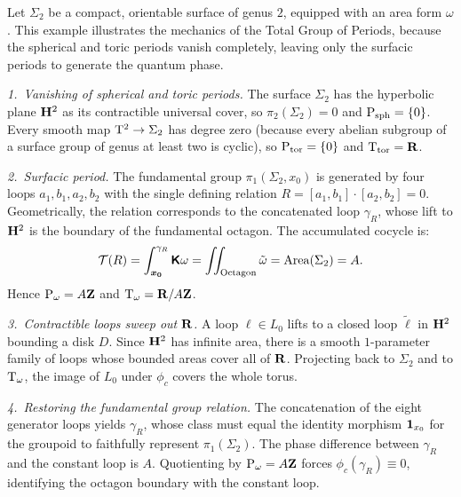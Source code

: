 \documentclass[11pt,reqno,letterpaper,twoside]{amsart}
\begin{document}
  \begin{article}
    \label{art:Explicit Construction: The Surface of Genus 2}
    
    Let $\Sigma_2$ be a compact,
    orientable surface of genus $2$,
    equipped with an area form $\omega$.
    This example illustrates the mechanics of the Total Group of Periods,
    because the spherical and toric periods vanish completely,
    leaving only the surfacic periods to generate the quantum phase.
    
    \textit{1.~Vanishing of spherical and toric periods.}
    The surface $\Sigma_2$ has the hyperbolic plane ${\mathbf H}^2$ as its contractible universal cover,
    so $\pi_2(\Sigma_2) = 0$ and $\operatorname{P}_{\mathrm{sph}} = \{0\}$.
    Every smooth map $\mathrm{T}^2 \to \Sigma_2$ has degree zero
    (because every abelian subgroup of a surface group of genus at least two is cyclic),
    so $\operatorname{P}_{\mathrm{tor}} = \{0\}$ and $\mathrm{T}_{\mathrm{tor}} = {\mathbf{R}}$.
    
    \textit{2.~Surfacic period.}
    The fundamental group $\pi_1(\Sigma_2, x_0)$ is generated by four loops $a_1, b_1, a_2, b_2$
    with the single defining relation $R = [a_1, b_1] \cdot [a_2, b_2] = 0$.
    Geometrically,
    the relation corresponds to the concatenated loop $\gamma_R$,
    whose lift to ${\mathbf H}^2$ is the boundary of the fundamental octagon.
    The accumulated cocycle is:
    \[
      \mathcal{T}(R) = \int_{\boldsymbol{x_0}}^{\gamma_R} \boldsymbol{\mathsf{K}}\omega = \iint_{\text{Octagon}} \tilde{\omega} = \mathrm{Area}(\Sigma_2) = A.
      \]
    Hence $\operatorname{P}_\omega = A{\mathbf{Z}}$ and $\mathrm{T}_\omega = {\mathbf{R}}/A{\mathbf{Z}}$.
    
    \textit{3.~Contractible loops sweep out ${\mathbf{R}}$.}
    A loop $\ell \in L_0$ lifts to a closed loop $\tilde{\ell}$ in ${\mathbf H}^2$ bounding a disk $D$.
    Since ${\mathbf H}^2$ has infinite area,
    there is a smooth $1$-parameter family of loops whose bounded areas cover all of ${\mathbf{R}}$.
    Projecting back to $\Sigma_2$ and to $\mathrm{T}_\omega$,
    the image of $L_0$ under $\phi_c$ covers the whole torus.
    
    \textit{4.~Restoring the fundamental group relation.}
    The concatenation of the eight generator loops yields $\gamma_R$,
    whose class must equal the identity morphism ${\mathbf{1}}_{x_0}$ for the groupoid to faithfully represent $\pi_1(\Sigma_2)$.
    The phase difference between $\gamma_R$ and the constant loop is $A$.
    Quotienting by $\operatorname{P}_\omega = A{\mathbf{Z}}$ forces $\phi_c(\gamma_R) \equiv 0$,
    identifying the octagon boundary with the constant loop.
  \end{article}
  
\end{document}
